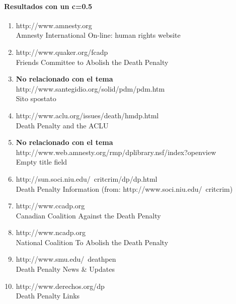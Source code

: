 \paragraph{Resultados con un c=0.5}
 \begin{enumerate}
 \item
http://www.amnesty.org\\
Amnesty International On-line: human rights website\\
\item
http://www.quaker.org/fcadp\\
Friends Committee to Abolish the Death Penalty\\
\item
\textbf{No relacionado con el tema}\\
http://www.santegidio.org/solid/pdm/pdm.htm\\
Sito spostato\\
\item
http://www.aclu.org/issues/death/hmdp.html\\
Death Penalty and the ACLU\\
\item
\textbf{No relacionado con el tema}\\
http://www.web.amnesty.org/rmp/dplibrary.nsf/index?openview\\
Empty title field\\
\item
http://sun.soci.niu.edu/~critcrim/dp/dp.html\\
Death Penalty Information (from: http://www.soci.niu.edu/~critcrim)\\
\item
http://www.ccadp.org\\
Canadian Coalition Against the Death Penalty\\
\item
http://www.ncadp.org\\
National Coalition To Abolish the Death Penalty\\
\item
http://www.smu.edu/~deathpen\\
Death Penalty News \& Updates\\
\item
http://www.derechos.org/dp\\
Death Penalty Links\\



\end{enumerate}
